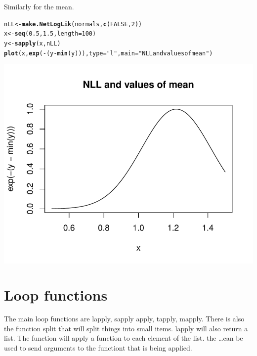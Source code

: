 \documentclass{article}\usepackage{graphicx, color}
\makeatletter
\def\maxwidth{ %
  \ifdim\Gin@nat@width>\linewidth
    \linewidth
  \else
    \Gin@nat@width
  \fi
}
\newcommand{\hlfunctioncall}[1]{\textcolor[rgb]{0.501960784313725,0,0.329411764705882}{\textbf{#1}}}%
\newcommand{\hlstring}[1]{\textcolor[rgb]{0.6,0.6,1}{#1}}%
\newenvironment{kframe}{%
 \def\at@end@of@kframe{}%
 \ifinner\ifhmode%
  \def\at@end@of@kframe{\end{minipage}}%
  \begin{minipage}{\columnwidth}%
 \fi\fi%
 \def\FrameCommand##1{\hskip\@totalleftmargin \hskip-\fboxsep
 \colorbox{shadecolor}{##1}\hskip-\fboxsep
     \hskip-\linewidth \hskip-\@totalleftmargin \hskip\columnwidth}%
 \MakeFramed {\advance\hsize-\width
   \@totalleftmargin\z@ \linewidth\hsize
   \@setminipage}}%
 {\par\unskip\endMakeFramed%
 \at@end@of@kframe}
\newenvironment{knitrout}{}{} %
\makeatother
\begin{document}
Similarly for the mean. 
\begin{knitrout}
\color{fgcolor}\begin{kframe}
\begin{alltt}
nLL <- \hlfunctioncall{make.NetLogLik}(normals, \hlfunctioncall{c}(FALSE, 2))
x <- \hlfunctioncall{seq}(0.5, 1.5, length = 100)
y <- \hlfunctioncall{sapply}(x, nLL)
\hlfunctioncall{plot}(x, \hlfunctioncall{exp}(-(y - \hlfunctioncall{min}(y))), type = \hlstring{"l"}, main = \hlstring{"NLL and values of mean"})
\end{alltt}
\end{kframe}
\includegraphics[width=\maxwidth]{figure/plotllm} 

\end{knitrout}


\section{Loop functions}
The main loop functions are lapply, sapply apply, tapply, mapply. There is also the function split that will split things into small items. lapply will also return a list.  The function will apply a function to each element of the list. the \dots can be used to send arguments to the functiont that is being applied. 
\end{document}
